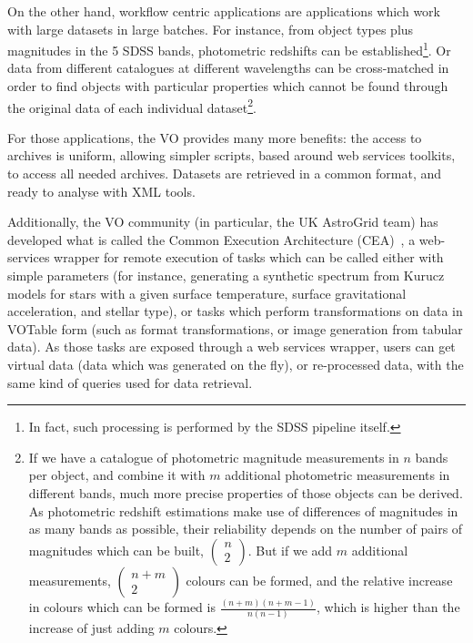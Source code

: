 		 On the other hand, workflow centric applications are
		applications which work with large datasets in large
		batches. For instance, from object types plus magnitudes in
		the 5 SDSS bands, photometric redshifts can be
		established\footnote{In fact, such processing is performed
		by the SDSS pipeline itself.}. Or data from different
		catalogues at different wavelengths can be cross-matched in
		order to find objects with particular properties which
		cannot be found through the original data of each
		individual dataset\footnote{If we have a catalogue of
		photometric magnitude measurements in $n$ bands per object,
		and combine it with $m$ additional photometric measurements
		in different bands, much more precise properties of those
		objects can be derived. As photometric redshift estimations
		make use of differences of magnitudes in as many bands as
		possible, their reliability depends on the number of pairs
		of magnitudes which can be built,
		$\begin{pmatrix}n\\2\end{pmatrix}$. But if we add $m$
		additional measurements, $\begin{pmatrix}n +
		m\\2\end{pmatrix}$ colours can be formed, and the relative
		increase in colours which can be formed is
		$\frac{(n+m)(n+m-1)}{n(n-1)}$, which is higher than the
		increase of just adding $m$ colours.}.
		
		 For those applications, the VO provides many more
		benefits: the access to archives is uniform, allowing
		simpler scripts, based around web services toolkits, to
		access all needed archives. Datasets are retrieved in a
		common format, and ready to analyse with XML tools.
		
		 Additionally, the VO community (in particular, the UK
		AstroGrid team) has
		developed what is called the Common Execution Architecture
		(CEA)~\cite{Harrison:2005la}, a web-services wrapper for
		remote execution of tasks which can be called either with
		simple parameters (for instance, generating a synthetic
		spectrum from Kurucz models for stars with a given surface
		temperature, surface gravitational acceleration, and
		stellar type), or tasks which perform transformations on
		data in VOTable form (such as format transformations, or
		image generation from tabular data). As those tasks are
		exposed through a web services wrapper, users can get
		virtual data (data which was generated on the fly), or
		re-processed data, with the same kind of queries used for
		data retrieval.
		
